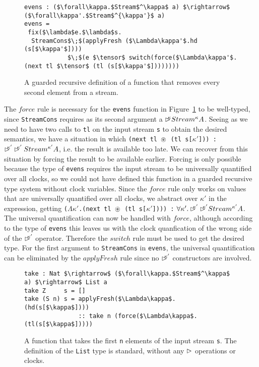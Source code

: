 \begin{figure}
\begin{lstlisting}[mathescape]
evens : ($\forall\kappa.$Stream$^\kappa$ a) $\rightarrow$ ($\forall\kappa'.$Stream$^{\kappa'}$ a)
evens = 
 fix($\lambda$e.$\lambda$s.
  StreamCons$\;$(applyFresh ($\Lambda\kappa'$.hd (s[$\kappa'$]))) 
            $\;$(e $\tensor$ switch(force($\Lambda\kappa'$.(next tl $\tensor$ (tl (s[$\kappa'$])))))))
\end{lstlisting}
\caption{A guarded recursive definition of a function that removes every second element from a stream.}
\label{fig:guarded_recursion_evens}
\end{figure}
The $force$ rule is necessary for the \texttt{evens} function in Figure~\ref{fig:guarded_recursion_evens} to be well-typed, since \texttt{StreamCons} requires as its second argument a $\rhd^{\!\!\!\kappa}Stream^\kappa A$. Seeing as we need to have two calls to \texttt{tl} on the input stream \texttt{s} to obtain the desired semantics, we have a situation in which \texttt{(next tl $\circledast$ (tl s[$\kappa'$])) :} $\rhd^{\!\!\!\kappa'}\rhd^{\!\!\!\kappa'}Stream^{\kappa'} A$, i.e. the result is available too late. We can recover from this situation by forcing the result to be available earlier. Forcing is only possible because the type of \texttt{evens} requires the input stream to be universally quantified over all clocks, so we could not have defined this function in a guarded recursive type system without clock variables. Since the $force$ rule only works on values that are universally quantified over all clocks, we abstract over $\kappa'$ in the expression, getting \texttt{($\Lambda\kappa'$.(next tl $\circledast$ (tl s[$\kappa'$]))) :} $\forall\kappa'.\rhd^{\!\!\!\kappa'}\rhd^{\!\!\!\kappa'}Stream^{\kappa'} A$. The universal quantification can now be handled with $force$, although according to the type of \texttt{evens} this leaves us with the clock quanfication of the wrong side of the $\rhd^{\!\!\!\kappa'}$ operator. Therefore the $switch$ rule must be used to get the desired type. For the first argument to \texttt{StreamCons} in \texttt{evens}, the universal quantification can be eliminated by the $applyFresh$ rule since no $\rhd^{\!\!\!\kappa'}$ constructors are involved.
\begin{figure}
\begin{lstlisting}[mathescape]
take : Nat $\rightarrow$ ($\forall\kappa.$Stream$^\kappa$ a) $\rightarrow$ List a
take Z     s = []
take (S n) s = applyFresh($\Lambda\kappa$.(hd(s[$\kappa$])))
               :: take n (force($\Lambda\kappa$.(tl(s[$\kappa$]))))
\end{lstlisting}
\caption{A function that takes the first \texttt{n} elements of the input stream \texttt{s}. The definition of the \texttt{List} type is standard, without any $\rhd$ operations or clocks.}
\label{fig:guarded_recursion_take}
\end{figure}

